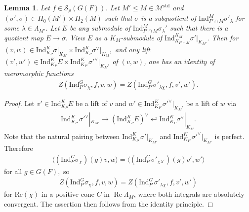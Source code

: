 \documentclass[10pt]{amsart}
\newtheorem{lemma}[theorem]{Lemma}
\theoremstyle{definition}
\numberwithin{equation}{section}
\numberwithin{equation}{subsection}
\newcommand{\Ind}{\mathrm{Ind}}
\renewcommand{\Im}{\mathop{\mathrm{Im}}}
\renewcommand{\Re}{\mathop{\mathrm{Re}}}
\begin{document}
\begin{lemma}\label{lem:cs:subquo} Let $f\in \mathcal{S}_\rho(G(F))$. Let $M'\le M\in\mathcal{M}^{\mathrm{std}}$ and $(\sigma',\sigma)\in\Pi_0(M')\times \Pi_2(M)$ such that $\sigma$ is a subquotient of $\mathrm{Ind}_{P'\cap M}^{M} \sigma'_{\lambda}$ for some $\lambda\in \Lambda_{M'}$. Let $E$ be any submodule of $ \mathrm{Ind}_{P'\cap M}^{M} \sigma_{\lambda}'$ such that there is a quotient map $E\to \sigma.$ View $E$ as a $K_M$-submodule of $\mathrm{Ind}_{K_{P'\cap M}}^{K_M} \sigma'|_{K_{M'}}.$ Then for $(v,w)\in \Ind_{K_P}^K\sigma\vert_{K_M}\times \Ind_{K_P}^K\sigma^\vee\vert_{K_M},$ and any lift $(v',w')\in \mathrm{Ind}_{K_P}^{K} E\times \mathrm{Ind}_{K_{P'}}^K \sigma'^\vee|_{K_M'}$ of $(v,w)$, one has an identity of meromorphic functions
    \begin{align*}
            Z(\mathrm{Ind}_P^G \sigma_\chi, f,v,w)=Z(\mathrm{Ind}_{P'}^G \sigma'_{\lambda\chi}, f,v',w').
    \end{align*}
\end{lemma}
\begin{proof} 

Let $v'\in \mathrm{Ind}_{K_P}^K E$ be a lift of $v$ and $w'\in \mathrm{Ind}_{K_{P'}}^K \sigma'^\vee|_{K_M'}$ be a lift of $w$ via
\begin{align*}
    \Ind_{K_{P'}}^K\sigma'^\lor|_{K_{M'}}\longrightarrow (\mathrm{Ind}_{K_P}^K E)^\lor \hookleftarrow \mathrm{Ind}_{K_P}^K \sigma^\lor|_{K_M}.
\end{align*}
Note that the natural pairing between $\mathrm{Ind}_{K_{P'}}^K\sigma'|_{K_{M'}}$ and $\mathrm{Ind}_{K_{P'}}^K\sigma'^\lor|_{K_{M'}}$ is perfect. Therefore
\begin{align*}
    \langle (\mathrm{Ind}_P^G\sigma_\chi)(g) v,w\rangle=\langle (\mathrm{Ind}_{P'}^G\sigma'_{\chi\lambda'})(g)v',w'\rangle
\end{align*}
for all $g\in G(F),$ so
   \begin{align*}
            Z(\mathrm{Ind}_P^G \sigma_\chi, f,v,w)=Z(\mathrm{Ind}_{P'}^G \sigma'_{\lambda\chi}, f,v',w')
    \end{align*}
for $\mathrm{Re}(\chi)$ in a positive cone $C$ in $\Re\Lambda_M$, where both integrals are absolutely convergent. The assertion then follows from the identity principle.
\end{proof}
\end{document}
